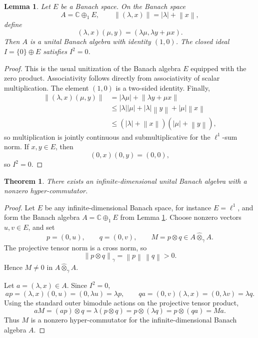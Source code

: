 \documentclass[11pt]{article}
\newtheorem{theorem}{Theorem}
\newtheorem{lemma}{Lemma}
\newcommand{\C}{\mathbb{C}}
\newcommand{\norm}[1]{\left\lVert #1 \right\rVert}
\newcommand{\hot}{\widehat{\otimes}_{\gamma}}
\begin{document}
\begin{lemma}\label{lem:unitization}
Let \(E\) be a Banach space.  On the Banach space
\[
  A=\C\oplus_1 E,\qquad
  \norm{(\lambda,x)}=|\lambda|+\norm{x},
\]
define
\[
  (\lambda,x)(\mu,y)=(\lambda\mu,\lambda y+\mu x).
\]
Then \(A\) is a unital Banach algebra with identity \((1,0)\).  The closed
ideal \(I=\{0\}\oplus E\) satisfies \(I^2=0\).
\end{lemma}

\begin{proof}
This is the usual unitization of the Banach algebra \(E\) equipped with the
zero product.  Associativity follows directly from associativity of scalar
multiplication.  The element \((1,0)\) is a two-sided identity.  Finally,
\[
\begin{aligned}
  \norm{(\lambda,x)(\mu,y)}
  &=|\lambda\mu|+\norm{\lambda y+\mu x}  \\
  &\le |\lambda||\mu|+|\lambda|\norm{y}+|\mu|\norm{x} \\
  &\le (|\lambda|+\norm{x})(|\mu|+\norm{y}),
\end{aligned}
\]
so multiplication is jointly continuous and submultiplicative for the
\(\ell^1\)-sum norm.  If \(x,y\in E\), then
\[
  (0,x)(0,y)=(0,0),
\]
so \(I^2=0\).
\end{proof}

\begin{theorem}\label{thm:main}
There exists an infinite-dimensional unital Banach algebra with a nonzero
hyper-commutator.
\end{theorem}

\begin{proof}
Let \(E\) be any infinite-dimensional Banach space, for instance \(E=\ell^1\),
and form the Banach algebra \(A=\C\oplus_1 E\) from Lemma
\ref{lem:unitization}.  Choose nonzero vectors \(u,v\in E\), and set
\[
  p=(0,u),\qquad q=(0,v),\qquad M=p\otimes q\in A\hot A.
\]
The projective tensor norm is a cross norm, so
\[
  \norm{p\otimes q}_{\gamma}=\norm{p}\,\norm{q}>0.
\]
Hence \(M\ne 0\) in \(A\hot A\).

Let \(a=(\lambda,x)\in A\).  Since \(I^2=0\),
\[
  ap=(\lambda,x)(0,u)=(0,\lambda u)=\lambda p,
  \qquad
  qa=(0,v)(\lambda,x)=(0,\lambda v)=\lambda q.
\]
Using the standard outer bimodule actions on the projective tensor product,
\[
  aM=(ap)\otimes q=\lambda(p\otimes q)
  =p\otimes(\lambda q)=p\otimes(qa)=Ma.
\]
Thus \(M\) is a nonzero hyper-commutator for the infinite-dimensional Banach
algebra \(A\).
\end{proof}
\end{document}
